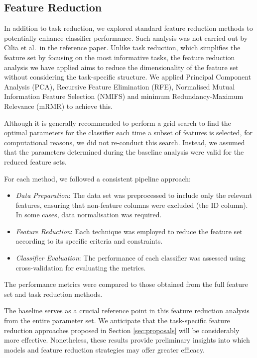 \documentclass[a4paper, 11pt]{article}
\begin{document}
\subsection{Feature Reduction} \label{sec:feature-reduction}
In addition to task reduction, we explored standard feature reduction methods to potentially enhance classifier performance. Such analysis was not carried out by Cilia et al.~in the reference paper. Unlike task reduction, which simplifies the feature set by focusing on the most informative tasks, the feature reduction  analysis we have applied aims to reduce the dimensionality of the feature set without considering the task-specific structure. We applied Principal Component Analysis (PCA), Recursive Feature Elimination (RFE), Normalised Mutual Information Feature Selection (NMIFS) and  minimum Redundancy-Maximum Relevance (mRMR) to achieve this.

Although it is generally recommended to perform a grid search to find the optimal parameters for the classifier each time a subset of features is selected, for computational reasons, we did not re-conduct this search. Instead, we assumed that the parameters determined during the baseline analysis were valid for the reduced feature sets.

For each method, we followed a consistent pipeline approach: 
\begin{itemize}
    \item \textit{Data Preparation}: The data set was preprocessed to include only the relevant features, ensuring that non-feature columns were excluded (the ID column). In some cases, data normalisation was required.
    \item \textit{Feature Reduction}: Each technique was employed to reduce the feature set according to its specific criteria and constraints.
    \item \textit{Classifier Evaluation}: The performance of each classifier was assessed using cross-validation for evaluating the metrics.
\end{itemize}

The performance metrics were compared to those obtained from the full feature set and task reduction methods. 

The baseline serves as a crucial reference point in this feature reduction analysis from the entire parameter set. We anticipate that the task-specific feature reduction approaches proposed in Section \ref{sec:proposals} will be considerably more effective. Nonetheless, these results provide preliminary insights into which models and feature reduction strategies may offer greater efficacy.
\end{document}
